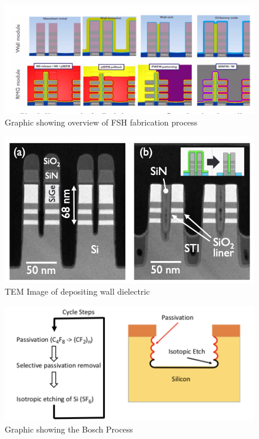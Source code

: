 \documentclass[letterpaper, 12 pt, conference]{ieeeconf}  %
\begin{document}
\begin{figure}[H]
    \centering
    \includegraphics[width=.9\linewidth]{Screen Shot 2022-03-03 at 3.28.55 PM.png}
    \caption{Graphic showing overview of FSH fabrication process \cite{c6} }
    \label{fig:knngraph1}
\end{figure}


\begin{figure}[H]
    \centering
    \includegraphics[width=.9\linewidth]{Screen Shot 2022-03-03 at 3.54.30 PM.png}
    \caption{TEM Image of depositing  wall dielectric \cite{c13} }
    \label{fig:knngraph1}
\end{figure}


\begin{figure}[H]
    \centering
    \includegraphics[width=.9\linewidth]{Screen Shot 2022-03-03 at 4.12.00 PM.png}
    \caption{Graphic showing the Bosch Process \cite{c14} }
    \label{fig:knngraph1}
\end{figure}
\end{document}

